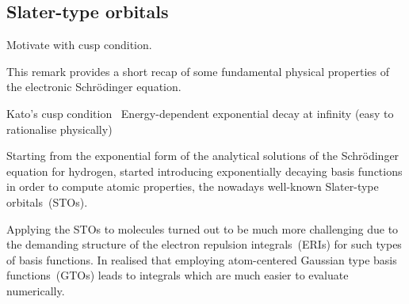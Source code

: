 \subsection{Slater-type orbitals}
\label{sec:STO}

Motivate with cusp condition.

\begin{rem}
	This remark provides a short recap of some
	fundamental physical properties of the electronic Schrödinger equation.

Kato's cusp condition~\cite{Kato1957}
Energy-dependent exponential decay at infinity
(easy to rationalise physically)
\end{rem}



Starting from the exponential form of the analytical solutions of the
Schrödinger equation for hydrogen,
\citet{Slater1930} started introducing exponentially decaying basis functions
in order to compute atomic properties,
the nowadays well-known Slater-type orbitals~(STOs).

Applying the STOs to molecules turned out to be much more
challenging due to the demanding structure of the electron repulsion integrals~(ERIs)
for such types of basis functions.
In \citeyear{Boys1950} \citeauthor{Boys1950} realised that employing
atom-centered Gaussian type basis functions~(GTOs) leads to integrals
which are much easier to evaluate numerically.


